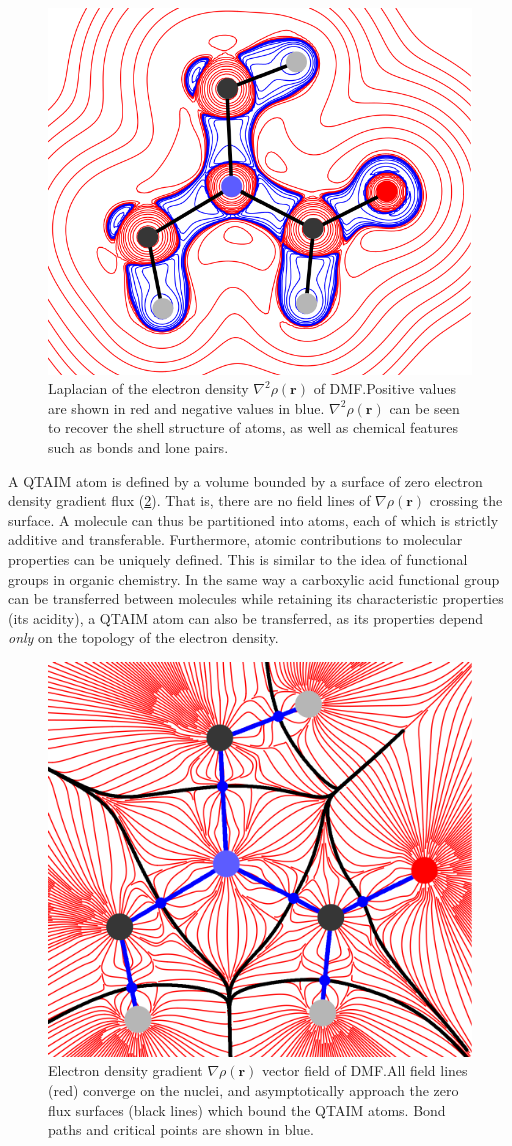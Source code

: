 \begin{refsection}
\begin{figure}
    \includegraphics[width=0.48\linewidth]{Figures/dmf-lapl.pdf}
    \caption[Laplacian of the electron density $ \nabla^{2}\rho(\textbf{r}) $ of DMF.]{Laplacian of the electron density $ \nabla^{2}\rho(\textbf{r}) $ of DMF.\@ Positive values are shown in red and negative values in blue. $ \nabla^{2}\rho(\textbf{r}) $ can be seen to recover the shell structure of atoms, as well as chemical features such as bonds and lone pairs.}\label{fig:dmf-lapl}
\end{figure}

A QTAIM atom is defined by a volume bounded by a surface of zero electron density gradient flux (\cref{fig:dmf-gradient}).
That is, there are no field lines of $ \nabla\rho(\textbf{r}) $ crossing the surface.
A molecule can thus be partitioned into atoms, each of which is strictly additive and transferable.
Furthermore, atomic contributions to molecular properties can be uniquely defined.
This is similar to the idea of functional groups in organic chemistry.
In the same way a carboxylic acid functional group can be transferred between molecules while retaining its characteristic properties (its acidity), a QTAIM atom can also be transferred, as its properties depend \emph{only} on the topology of the electron density.

\begin{figure}
    \includegraphics[width=0.48\linewidth]{Figures/dmf-grad.pdf}
    \caption[Electron density gradient $ \nabla\rho(\textbf{r}) $ vector field of DMF.]{Electron density gradient $ \nabla\rho(\textbf{r}) $ vector field of DMF.\@ All field lines (red) converge on the nuclei, and asymptotically approach the zero flux surfaces (black lines) which bound the QTAIM atoms. Bond paths and critical points are shown in blue.}\label{fig:dmf-gradient}
\end{figure}


\end{refsection}
